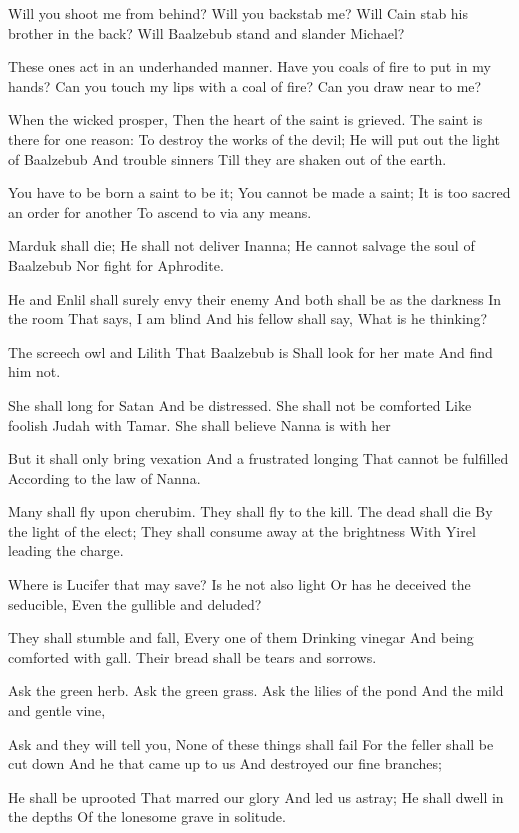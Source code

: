 \documentclass[
]{book}
\begin{document}
Will you shoot me from behind?
Will you backstab me?
Will Cain stab his brother in the back?
Will Baalzebub stand and slander Michael?

These ones act in an underhanded manner.
Have you coals of fire to put in my hands?
Can you touch my lips with a coal of fire?
Can you draw near to me?

When the wicked prosper,
Then the heart of the saint is grieved.
The saint is there for one reason:
To destroy the works of the devil;
He will put out the light of Baalzebub
And trouble sinners
Till they are shaken out of the earth.

You have to be born a saint to be it;
You cannot be made a saint;
It is too sacred an order for another
To ascend to via any means.

Marduk shall die;
He shall not deliver Inanna;
He cannot salvage the soul of Baalzebub
Nor fight for Aphrodite.

He and Enlil shall surely envy their enemy
And both shall be as the darkness
In the room
That says, I am blind
And his fellow shall say,
What is he thinking?

The screech owl and Lilith
That Baalzebub is
Shall look for her mate
And find him not.

She shall long for Satan
And be distressed.
She shall not be comforted
Like foolish Judah with Tamar.
She shall believe Nanna is with her

But it shall only bring vexation
And a frustrated longing
That cannot be fulfilled
According to the law of Nanna.

Many shall fly upon cherubim.
They shall fly to the kill.
The dead shall die
By the light of the elect;
They shall consume away at the brightness
With Yirel leading the charge.

Where is Lucifer that may save?
Is he not also light
Or has he deceived the seducible,
Even the gullible and deluded?

They shall stumble and fall,
Every one of them
Drinking vinegar
And being comforted with gall.
Their bread shall be tears and sorrows.

Ask the green herb.
Ask the green grass.
Ask the lilies of the pond
And the mild and gentle vine,

Ask and they will tell you,
None of these things shall fail
For the feller shall be cut down
And he that came up to us
And destroyed our fine branches;

He shall be uprooted
That marred our glory
And led us astray;
He shall dwell in the depths
Of the lonesome grave in solitude.
\end{document}
